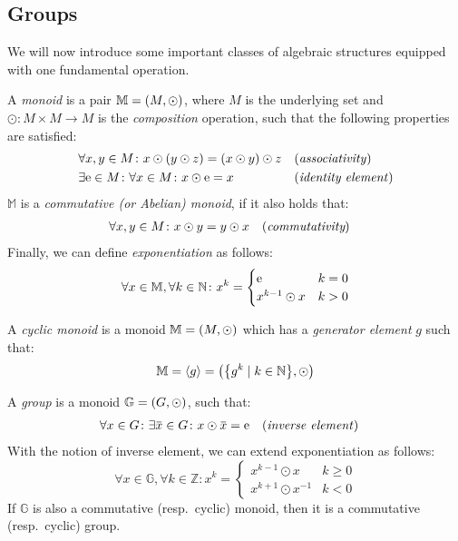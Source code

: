 \subsection{Groups}
We will now introduce some important classes of algebraic structures equipped with one fundamental 
operation. 
\begin{definition}[Monoid]
  A \emph{monoid} is a pair \(\mathbb{M} = \Tuple{M, \odot} \), where \(M\) is the 
  underlying set and \(\odot\colon M \times M \to M\) is the \emph{composition} 
  operation, such that the following properties are satisfied: 
  \begin{align*}
    & \forall x,y \in M\colon x \odot \Parens*{y \odot z} = \Parens*{x \odot y} \odot z
      && \textnormal{(\emph{associativity})} \\
    & \exists \id \in M\colon \forall x \in M\colon x \odot \id = x
      && \textnormal{(\emph{identity element})}
  \end{align*}
  \(\mathbb{M}\) is a \emph{commutative (or Abelian) monoid}, if it also holds that:
  \begin{align*}
    & \forall x,y \in M\colon x \odot y = y \odot x && (\emph{commutativity})
  \end{align*}
  Finally, we can define \emph{exponentiation} as follows:
  \begin{equation}\label{eq:exponentiation}    
    \forall x \in \mathbb{M}, \forall k \in \mathbb{N}\colon x^{k} = 
    \begin{cases}
      \id & k = 0 \\
      x^{k-1} \odot x & k > 0
    \end{cases}
  \end{equation}
\end{definition}

\begin{definition}
  A \emph{cyclic monoid} is a monoid \(\mathbb{M} = \Tuple{M, \odot}\) which has a 
  \emph{generator element} \(g\) such that:
  \[\mathbb{M} = \gengroup{g} = \Tuple{\Set{g^k \mid k \in \mathbb{N}}, \odot} \]
\end{definition}

\begin{definition}[Group]
  A \emph{group} is a monoid \(\mathbb{G} = \Tuple{G, \odot} \), such that: 
  \begin{align*}    
    & \forall x \in G\colon \exists \inv{x} \in G\colon x \odot \inv{x} = \id
    && \textnormal{(\emph{inverse element})}
  \end{align*}
  With the notion of inverse element, we can extend exponentiation as follows:
  \[
    \forall x \in \mathbb{G},\forall k \in \mathbb{Z}\colon x^k =
    \begin{cases}
      x^{k-1} \odot x & k \ge 0 \\
      x^{k+1} \odot x^{-1} & k < 0
    \end{cases}
  \]
  If \(\mathbb{G}\) is also a commutative (resp.\ cyclic) monoid, then it is a 
  commutative (resp.\ cyclic) group.
\end{definition}

